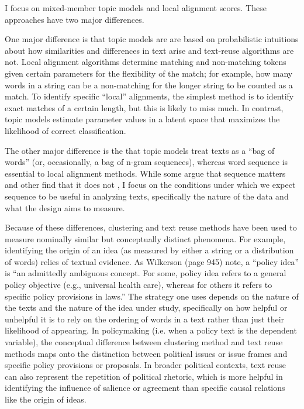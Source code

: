 \documentclass{article}
\begin{document}
I focus on mixed-member topic models and local alignment scores. These approaches have two major differences. 

One major difference is that topic models are are based on probabilistic intuitions about how similarities and differences in text arise and text-reuse algorithms are not. Local alignment algorithms determine matching and non-matching tokens given certain parameters for the flexibility of the match; for example, how many words in a string can be a non-matching for the longer string to be counted as a match. To identify specific ``local'' alignments, the simplest method is to identify exact matches of a certain length, but this is likely to miss much.   In contrast, topic models estimate parameter values in a latent space that maximizes the likelihood of correct classification. 

The other major difference is the that topic models treat texts as a ``bag of words'' (or, occasionally, a bag of n-gram sequences), whereas word sequence is essential to local alignment methods. While some argue that sequence matters \citep{Wilkerson2015} and other find that it does not \citep{Grimmer2013}, I focus on the conditions under which we expect sequence to be useful in analyzing texts, specifically the nature of the data and what the design aims to measure.

Because of these differences, clustering and text reuse methods have been used to measure nominally similar but conceptually distinct phenomena. For example, identifying the origin of an idea (as measured by either a string or a distribution of words) relies of textual evidence. As Wilkerson (page 945) note, a ``policy idea'' is ``an admittedly ambiguous concept. For some, policy idea refers to a general policy objective (e.g., universal health care), whereas for others it refers to specific policy provisions in laws.'' The strategy one uses depends on the nature of the texts and the nature of the idea under study, specifically on how helpful or unhelpful it is to rely on the ordering of words in a text rather than just their likelihood of appearing. In policymaking (i.e. when a policy text is the dependent variable), the conceptual difference between clustering method and text reuse methods maps onto the distinction between political issues or issue frames and specific policy provisions or proposals. In broader political contexts, text reuse can also represent the repetition of political rhetoric, which is more helpful in identifying the influence of salience or agreement than specific causal relations like the origin of ideas. 
\end{document}

